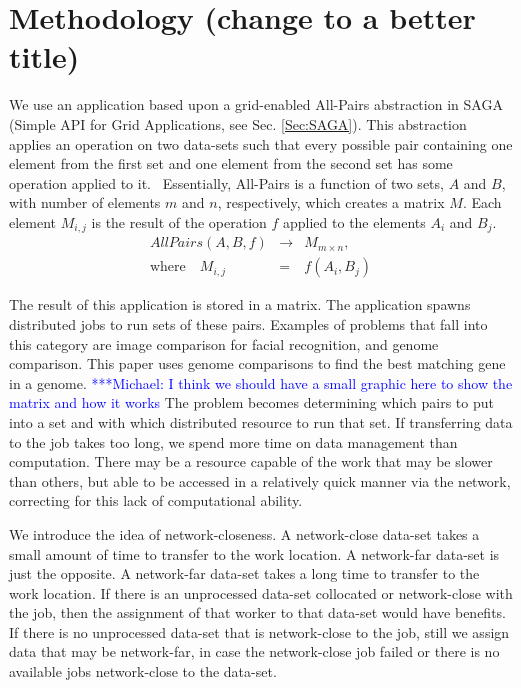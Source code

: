 \documentclass{rspublic}
\newcommand{\micnote}[1]{ {\textcolor{blue} { ***Michael: #1 }}}
\begin{document}
\section {Methodology (change to a better title)} We use an application
based upon a grid-enabled All-Pairs abstraction in SAGA (Simple API for
Grid Applications, see Sec. \ref{Sec:SAGA}). This abstraction applies an
operation on two data-sets such that every possible pair containing one
element from the first set and one element from the second set has some
operation applied to it.~\citep{Interop, AllPairs}  Essentially,
All-Pairs is a function of two sets, $A$ and $B$, with number of
elements $m$ and $n$, respectively, which creates a matrix $M$. Each
element $M_{i,j}$ is the result of the operation $f$ applied to the
elements $A_i$ and $B_j$.
\begin{eqnarray}
 AllPairs(A, B, f) & \rightarrow & M_{m \times n}, \\
\mbox{where} \quad M_{i,j} & = & f(A_{i},B_{j})
 \end{eqnarray}
 
The result of this application is stored in a matrix.  The application
spawns distributed jobs to run sets of these pairs.  Examples of
problems that fall into this category are image comparison for facial
recognition, and genome comparison.  This paper uses genome comparisons
to find the best matching gene in a genome. \micnote{I think we should
have a small graphic here to show the matrix and how it works} The
problem becomes determining which pairs to put into a set and with which
distributed resource to run that set.  If transferring data to the job
takes too long, we spend more time on data management than computation.
There may be a resource capable of the work that may be slower than
others, but able to be accessed in a relatively quick manner via the
network, correcting for this lack of computational ability. 

We introduce the idea of network-closeness.  A network-close data-set
takes a small amount of time to transfer to the work location.  A
network-far data-set is just the opposite.  A network-far data-set takes
a long time to transfer to the work location.  If there is an
unprocessed data-set collocated or network-close with the job, then the
assignment of that worker to that data-set would have benefits.  If
there is no unprocessed data-set that is network-close to the job, still
we assign data that may be network-far, in case the network-close job
failed or there is no available jobs network-close to the data-set.
\end{document}
